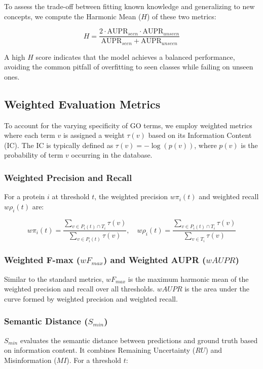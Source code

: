 \documentclass{article}
\begin{document}
To assess the trade-off between fitting known knowledge and generalizing to new concepts, we compute the Harmonic Mean ($H$) of these two metrics:

\begin{equation}
    H = \frac{2 \cdot \text{AUPR}_{seen} \cdot \text{AUPR}_{unseen}}{\text{AUPR}_{seen} + \text{AUPR}_{unseen}}
\end{equation}

A high $H$ score indicates that the model achieves a balanced performance, avoiding the common pitfall of overfitting to seen classes while failing on unseen ones.

\subsection{Weighted Evaluation Metrics}

To account for the varying specificity of GO terms, we employ weighted metrics where each term $v$ is assigned a weight $\tau(v)$ based on its Information Content (IC). The IC is typically defined as $\tau(v) = -\log(p(v))$, where $p(v)$ is the probability of term $v$ occurring in the database.

\subsubsection{Weighted Precision and Recall}
For a protein $i$ at threshold $t$, the weighted precision $w\pi_i(t)$ and weighted recall $w\rho_i(t)$ are:

\begin{equation}
    w\pi_i(t) = \frac{\sum_{v \in P_i(t) \cap T_i} \tau(v)}{\sum_{v \in P_i(t)} \tau(v)}, \quad w\rho_i(t) = \frac{\sum_{v \in P_i(t) \cap T_i} \tau(v)}{\sum_{v \in T_i} \tau(v)}
\end{equation}

\subsubsection{Weighted F-max ($wF_{max}$) and Weighted AUPR ($wAUPR$)}
Similar to the standard metrics, $wF_{max}$ is the maximum harmonic mean of the weighted precision and recall over all thresholds. $wAUPR$ is the area under the curve formed by weighted precision and weighted recall.

\subsubsection{Semantic Distance ($S_{min}$)}
$S_{min}$ evaluates the semantic distance between predictions and ground truth based on information content. It combines Remaining Uncertainty ($RU$) and Misinformation ($MI$). For a threshold $t$:
\end{document}

